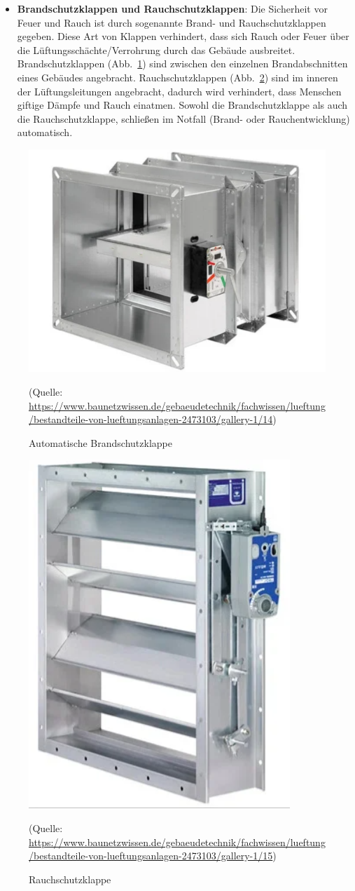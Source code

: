 \begin{itemize}
	\item \textbf{Brandschutzklappen und Rauchschutzklappen}:
	Die Sicherheit vor Feuer und Rauch ist durch sogenannte Brand- und Rauchschutzklappen gegeben.
	Diese Art von Klappen verhindert, dass sich Rauch oder Feuer über die Lüftungsschächte/Verrohrung durch das Gebäude ausbreitet. Brandschutzklappen (Abb.~\ref{fig:Brandschutzklappe}) sind zwischen den einzelnen Brandabschnitten eines Gebäudes angebracht. Rauchschutzklappen (Abb.~\ref{fig:Rauchschutzklappe}) sind im inneren der Lüftungsleitungen angebracht, dadurch wird verhindert, dass Menschen giftige Dämpfe und Rauch einatmen. Sowohl die Brandschutzklappe als auch die Rauchschutzklappe, schließen im Notfall (Brand- oder Rauchentwicklung) automatisch. \cite[vgl.][]{baunetz_bestandteile_nodate:o.J.}
\end{itemize}

\begin{figure}[H]
	\centering
	\includegraphics[width=0.4\linewidth]{Bilder/brandschutzklappe}
	\caption{Automatische Brandschutzklappe} 
	(Quelle: \url{	https://www.baunetzwissen.de/gebaeudetechnik/fachwissen/lueftung/bestandteile-von-lueftungsanlagen-2473103/gallery-1/14})
	\label{fig:Brandschutzklappe}
\end{figure}

\begin{figure}[H]
	\centering
	\includegraphics[width=0.3\linewidth]{Bilder/rauchschutzklappe}
	\caption{Rauchschutzklappe} 
	(Quelle: \url{	https://www.baunetzwissen.de/gebaeudetechnik/fachwissen/lueftung/bestandteile-von-lueftungsanlagen-2473103/gallery-1/15})
	\label{fig:Rauchschutzklappe}
\end{figure}


